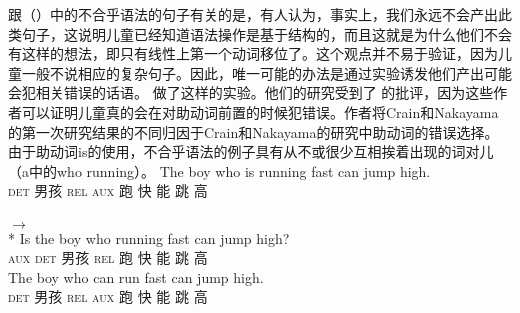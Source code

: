 跟（）中的不合乎语法的句子有关的是，有人认为，事实上，我们永远不会产出此类句子，这说明儿童已经知道语法操作是基于结构的，而且这就是为什么他们不会有这样的想法，即只有线性上第一个动词移位了\citep{CN87a-u}。这个观点并不易于验证，因为儿童一般不说相应的复杂句子。因此，唯一可能的办法是通过实验诱发他们产出可能会犯相关错误的话语。 \citet{CN87a-u}做了这样的实验。他们的研究受到了 \citet*{ARP2008a}的批评，因为这些作者可以证明儿童真的会在对助动词前置的时候犯错误。作者将Crain和Nakayama的第一次研究结果的不同归因于Crain和Nakayama的研究中助动词的错误选择。由于助动词is的使用，不合乎语法的例子具有从不或很少互相挨着出现的词对儿（a中的who running）。
\eal
\ex 
\gll  {} The boy who is running fast can jump high. \\
      {}              \textsc{det} 男孩 \textsc{rel} \textsc{aux} 跑 快 能 跳 高\\
\glt {}\\
$\to$\\
 {}* \gll Is the boy who running fast can jump high?\\
          \textsc{aux} \textsc{det} 男孩 \textsc{rel} 跑 快 能 跳 高\\
\ex 
\gll {} The boy who can run fast can jump high. \\
     {}              \textsc{det} 男孩 \textsc{rel} \textsc{aux} 跑 快 能 跳 高\\
